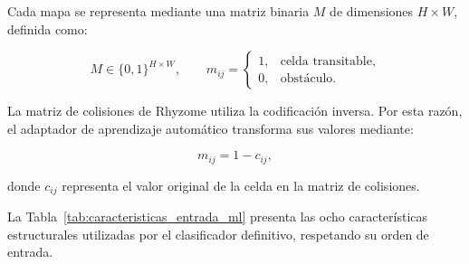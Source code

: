 Cada mapa se representa mediante una matriz binaria $M$ de dimensiones $H \times W$, definida como:

\begin{equation}
	M \in \{0,1\}^{H \times W},
	\qquad
	m_{ij} =
	\begin{cases}
		1, & \text{celda transitable},\\
		0, & \text{obstáculo}.
	\end{cases}
	\label{eq:representacion_binaria_ml}
\end{equation}

La matriz de colisiones de Rhyzome utiliza la codificación inversa. Por esta razón, el adaptador de aprendizaje automático transforma sus valores mediante:

\begin{equation}
	m_{ij}=1-c_{ij},
	\label{eq:conversion_collision_ml}
\end{equation}

donde $c_{ij}$ representa el valor original de la celda en la matriz de colisiones.

La Tabla~\ref{tab:caracteristicas_entrada_ml} presenta las ocho características estructurales utilizadas por el clasificador definitivo, respetando su orden de entrada.

